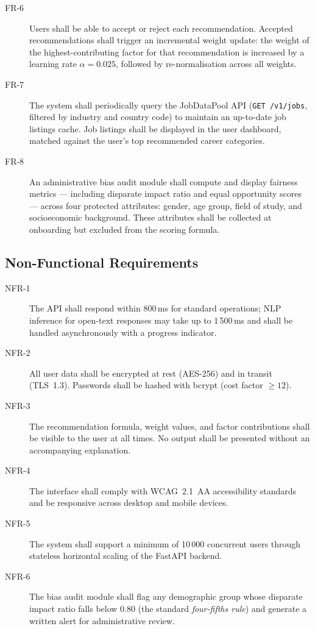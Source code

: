 \begin{description}
\item[FR-6] Users shall be able to accept or reject each recommendation.
Accepted recommendations shall trigger an incremental weight update: the weight
of the highest-contributing factor for that recommendation is increased by a
learning rate $\alpha = 0.025$, followed by re-normalisation across all weights.

\item[FR-7] The system shall periodically query the JobDataPool API
(\texttt{GET /v1/jobs}, filtered by industry and country code) to maintain an
up-to-date job listings cache. Job listings shall be displayed in the user
dashboard, matched against the user's top recommended career categories.

\item[FR-8] An administrative bias audit module shall compute and display
fairness metrics --- including disparate impact ratio and equal opportunity
scores --- across four protected attributes: gender, age group, field of study,
and socioeconomic background. These attributes shall be collected at onboarding
but excluded from the scoring formula.

\end{description}

\subsection*{Non-Functional Requirements}

\begin{description}

\item[NFR-1] The API shall respond within 800\,ms for standard operations;
NLP inference for open-text responses may take up to 1\,500\,ms and shall be
handled asynchronously with a progress indicator.

\item[NFR-2] All user data shall be encrypted at rest (AES-256) and in transit
(TLS~1.3). Passwords shall be hashed with bcrypt (cost factor $\geq 12$).

\item[NFR-3] The recommendation formula, weight values, and factor contributions
shall be visible to the user at all times. No output shall be presented without
an accompanying explanation.

\item[NFR-4] The interface shall comply with WCAG~2.1~AA accessibility
standards and be responsive across desktop and mobile devices.

\item[NFR-5] The system shall support a minimum of 10\,000 concurrent users
through stateless horizontal scaling of the FastAPI backend.

\item[NFR-6] The bias audit module shall flag any demographic group whose
disparate impact ratio falls below 0.80 (the standard \emph{four-fifths rule})
and generate a written alert for administrative review.

\end{description}

